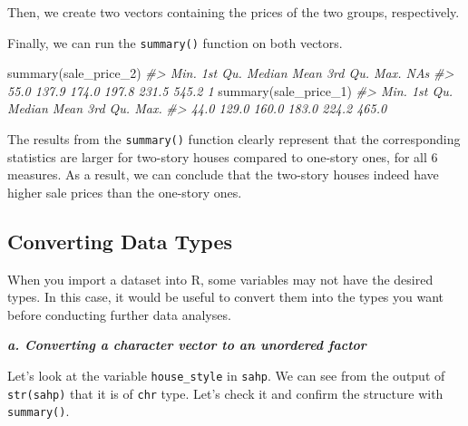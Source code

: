 \documentclass[
]{book}
\newenvironment{Shaded}{\begin{snugshade}}{\end{snugshade}}
\newcommand{\CommentTok}[1]{\textcolor[rgb]{0.56,0.35,0.01}{\textit{#1}}}
\newcommand{\FunctionTok}[1]{\textcolor[rgb]{0.00,0.00,0.00}{#1}}
\newcommand{\NormalTok}[1]{#1}
\newcommand{\OtherTok}[1]{\textcolor[rgb]{0.56,0.35,0.01}{#1}}
\newcommand{\SpecialCharTok}[1]{\textcolor[rgb]{0.00,0.00,0.00}{#1}}
\begin{document}
Then, we create two vectors containing the prices of the two groups, respectively.

\begin{Shaded}
\end{Shaded}

Finally, we can run the \texttt{summary()} function on both vectors.

\begin{Shaded}
\begin{Highlighting}[]
\FunctionTok{summary}\NormalTok{(sale\_price\_2)}
\CommentTok{\#\textgreater{}    Min. 1st Qu.  Median    Mean 3rd Qu.    Max.    NA\textquotesingle{}s }
\CommentTok{\#\textgreater{}    55.0   137.9   174.0   197.8   231.5   545.2       1}
\FunctionTok{summary}\NormalTok{(sale\_price\_1)}
\CommentTok{\#\textgreater{}    Min. 1st Qu.  Median    Mean 3rd Qu.    Max. }
\CommentTok{\#\textgreater{}    44.0   129.0   160.0   183.0   224.2   465.0}
\end{Highlighting}
\end{Shaded}

The results from the \texttt{summary()} function clearly represent that the corresponding statistics are larger for two-story houses compared to one-story ones, for all 6 measures. As a result, we can conclude that the two-story houses indeed have higher sale prices than the one-story ones.

\hypertarget{converting-data-types}{%
\subsection{Converting Data Types}\label{converting-data-types}}

When you import a dataset into R, some variables may not have the desired types. In this case, it would be useful to convert them into the types you want before conducting further data analyses.

\textbf{\emph{a. Converting a character vector to an unordered factor}}

Let's look at the variable \texttt{house\_style} in \texttt{sahp}. We can see from the output of \texttt{str(sahp)} that it is of \texttt{chr} type. Let's check it and confirm the structure with \texttt{summary()}.
\end{document}
